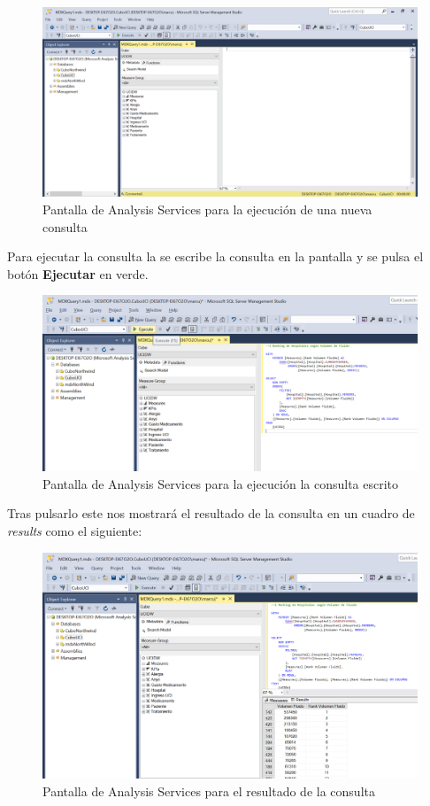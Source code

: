 \documentclass{article}
\begin{document}
	 \begin{figure}[H]
	 	\centering
	 	\includegraphics[width=1\linewidth]{images/pantallaconsulta.png}
	 	\caption{Pantalla de Analysis Services para la ejecución de una nueva consulta}
	 	\label{fig:pantallaconsulta}
	 \end{figure}
	 
	 Para ejecutar la consulta la se escribe la consulta en la pantalla y se pulsa el botón \textbf{Ejecutar} en verde.
	 
	 \begin{figure}[H]
	 	\centering
	 	\includegraphics[width=1\linewidth]{images/ejecutar.png}
	 	\caption{Pantalla de Analysis Services para la ejecución la consulta escrito}
	 	\label{fig:ejecutar}
	 \end{figure}
	 
	  Tras pulsarlo este nos mostrará el resultado de la consulta en un cuadro de \textit{results} como el siguiente: 
	  
	  \begin{figure}[H]
	  	\centering
	  	\includegraphics[width=1\linewidth]{images/resultado.png}
	  	\caption{Pantalla de Analysis Services para el resultado de la consulta}
	  	\label{fig:resultado}
	  \end{figure}
	 
\end{document}

